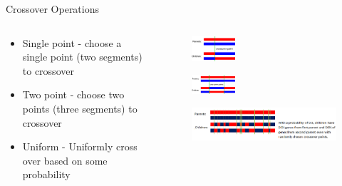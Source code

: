 \begin{frame}{Crossover Operations}
	\begin{columns}[onlytextwidth]
	\begin{column}{0.4\textwidth}
  \begin{itemize}
    \item Single point - choose a single point (two segments) to crossover
    \item Two point - choose two points (three segments) to crossover
    \item Uniform - Uniformly cross over based on some probability
  \end{itemize}
	\end{column}
	\begin{column}{0.55\textwidth}
    \begin{figure}
      \centering
      \includegraphics[width=0.3\textwidth]{SinglePointCrossover.png}
    \end{figure}
    \begin{figure}
      \centering
      \includegraphics[width=0.3\textwidth]{TwoPointCrossover.png}
    \end{figure}
    \begin{figure}
      \centering
      \includegraphics[width=\textwidth]{UniformCrossover.png}
    \end{figure}
	\end{column}
	\end{columns}
\end{frame}
